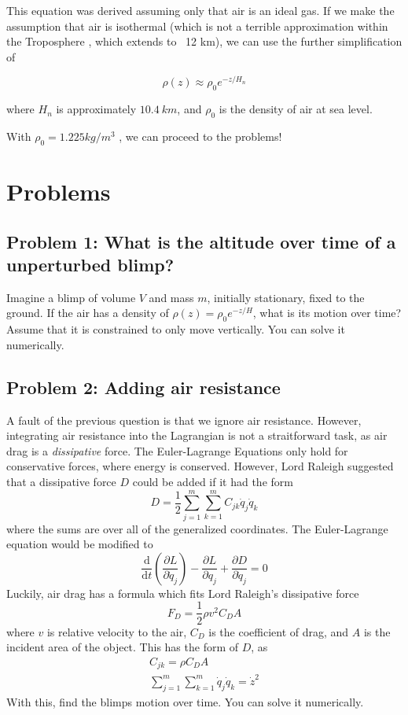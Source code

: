 \documentclass[titlepage]{article}
\begin{document}
This equation was derived assuming only that air is an ideal gas. If we make the assumption that air is isothermal (which is not a terrible approximation within the Troposphere \cite{troposphere}, which extends to ~12 km), we can use the further simplification of

\[
    \rho(z) \approx \rho_{0} e^{-z / H_{n}}
\]

where $H_n$ is approximately $10.4~km$, and $\rho_0$ is the density of air at sea level.

With $ \rho_0 = 1.225 kg/m^3 $\cite{density_eqn} , we can proceed to the problems!

\section{Problems}

\subsection{Problem 1: What is the altitude over time of a unperturbed blimp?}

Imagine a blimp of volume $V$ and mass $m$, initially stationary, fixed to the ground. If the air has a density of $\rho(z) = \rho_0 e^{-{z / H}} $, what is its motion over time? Assume that it is constrained to only move vertically. You can solve it numerically.

\subsection{Problem 2: Adding air resistance}

A fault of the previous question is that we ignore air resistance. However, integrating air resistance into the Lagrangian is not a straitforward task, as air drag is a \textit{dissipative} force. The Euler-Lagrange Equations only hold for conservative forces, where energy is conserved. However, Lord Raleigh suggested \cite{raleigh} that a dissipative force $D$ could be added if it had the form 
\[
    D=\frac{1}{2} \sum_{j=1}^{m} \sum_{k=1}^{m} C_{j k} \dot{q}_{j} \dot{q}_{k} 
\]
where the sums are over all of the generalized coordinates. The Euler-Lagrange equation would be modified to
\[
    \frac{\mathrm{d}}{\mathrm{d} t}\left(\frac{\partial L}{\partial \dot{q}_{j}}\right)-\frac{\partial L}{\partial q_{j}}+\frac{\partial D}{\partial \dot{q}_{j}} = 0 
\]
Luckily, air drag has a formula which fits Lord Raleigh's dissipative force \cite{drag}
\[
    F_{D}=\frac{1}{2} \rho v^{2} C_{D} A 
\]
where $v$ is relative velocity to the air, $C_D$ is the coefficient of drag, and $A$ is the incident area of the object. This has the form of $D$, as 
\[
    \begin{split}
        C_{jk} = \rho C_D A \\
        \sum_{j=1}^{m} \sum_{k=1}^{m} \dot{q}_{j} \dot{q}_{k} = \dot {z}^2
    \end{split}
\]
With this, find the blimps motion over time. You can solve it numerically.
\end{document}
